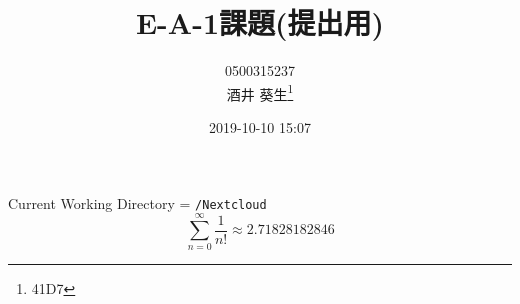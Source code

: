 \documentclass{jsarticle}[12pt]
\title{E-A-1課題(提出用)}
\date{2019-10-10 15:07}
\author{{\small\textsc{0500315237}}\\酒井 葵生\thanks{41D7}}
\begin{document}
\maketitle
Current Working Directory = \verb|/Nextcloud|
\[ \sum_{n=0}^{\infty}\frac{1}{n!} \approx
2.71828182846
\]
\end{document}
